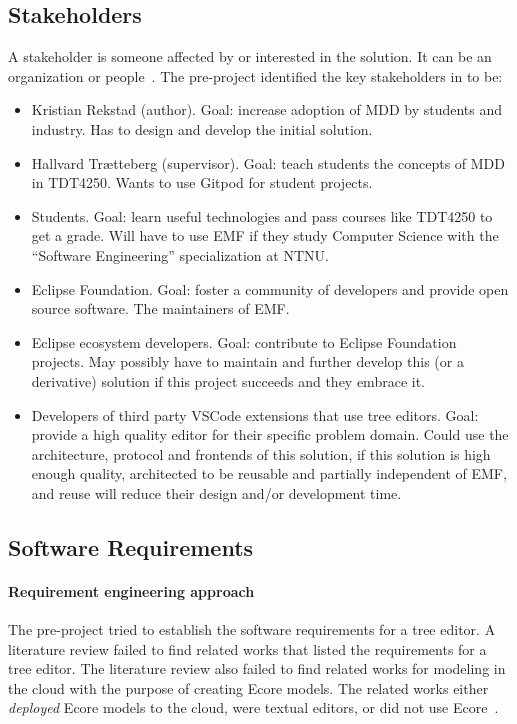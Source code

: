 \subsection{Stakeholders}

A stakeholder is someone affected by or interested in the solution.
It can be an organization or people~\cite[p.~52]{bassSoftwareArchitecturePractice2013}.
The pre-project identified the key stakeholders in \cite[p.~3]{rekstadModelingEnvironmentCloud2020} to be:

\begin{itemize}
  \item Kristian Rekstad (author). Goal: increase adoption of \acrshort{MDD} by students and industry. Has to design and develop the initial solution.
  \item Hallvard Trætteberg (supervisor). Goal: teach students the concepts of \acrshort{MDD} in \gls{TDT4250}. Wants to use \gls{Gitpod} for student projects.
  \item Students. Goal: learn useful technologies and pass courses like \gls{TDT4250} to get a grade. Will have to use \acrshort{EMF} if they study Computer Science with the ``Software Engineering'' specialization at \acrshort{NTNU}.
  \item Eclipse Foundation. Goal: foster a community of developers and provide open source software. The maintainers of \acrshort{EMF}.
  \item Eclipse ecosystem developers. Goal: contribute to Eclipse Foundation projects. May possibly have to maintain and further develop this (or a derivative) solution if this project succeeds and they embrace it.
  \item Developers of third party \gls{VSCode} extensions that use tree editors. Goal: provide a high quality editor for their specific problem domain. Could use the architecture, protocol and frontends of this solution, if this solution is high enough quality, architected to be reusable and partially independent of \acrshort{EMF}, and reuse will reduce their design and/or development time.
\end{itemize}

\subsection{Software Requirements}

\paragraph{Requirement engineering approach}
The pre-project tried to establish the software requirements for a tree editor.
A literature review failed to find related works that listed the requirements for a tree editor.
The literature review also failed to find related works for modeling in the cloud with the purpose of creating \gls{Ecore} models.
The related works either \textit{deployed} \gls{Ecore} models to the cloud, were textual editors, or did not use \gls{Ecore}~\cite[p.~3]{rekstadModelingEnvironmentCloud2020}.


